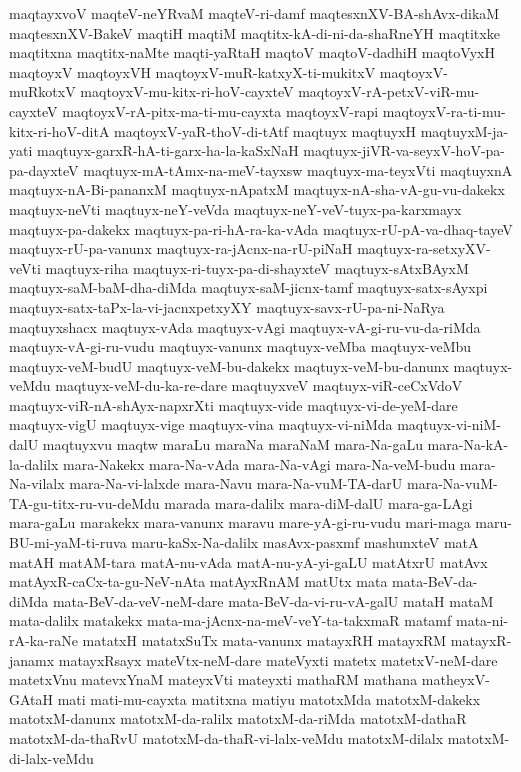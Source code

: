 {maqtayxvoV
maqteV-neYRvaM
maqteV-ri-damf
maqtesxnXV-BA-shAvx-dikaM
maqtesxnXV-BakeV
maqtiH
maqtiM
maqtitx-kA-di-ni-da-shaRneYH
maqtitxke
maqtitxna
maqtitx-naMte
maqti-yaRtaH
maqtoV
maqtoV-dadhiH
maqtoVyxH
maqtoyxV
maqtoyxVH
maqtoyxV-muR-katxyX-ti-mukitxV
maqtoyxV-muRkotxV
maqtoyxV-mu-kitx-ri-hoV-cayxteV
maqtoyxV-rA-petxV-viR-mu-cayxteV
maqtoyxV-rA-pitx-ma-ti-mu-cayxta
maqtoyxV-rapi
maqtoyxV-ra-ti-mu-kitx-ri-hoV-ditA
maqtoyxV-yaR-thoV-di-tAtf
maqtuyx
maqtuyxH
maqtuyxM-ja-yati
maqtuyx-garxR-hA-ti-garx-ha-la-kaSxNaH
maqtuyx-jiVR-va-seyxV-hoV-pa-pa-dayxteV
maqtuyx-mA-tAmx-na-meV-tayxsw
maqtuyx-ma-teyxVti
maqtuyxnA
maqtuyx-nA-Bi-pananxM
maqtuyx-nApatxM
maqtuyx-nA-sha-vA-gu-vu-dakekx
maqtuyx-neVti
maqtuyx-neY-veVda
maqtuyx-neY-veV-tuyx-pa-karxmayx
maqtuyx-pa-dakekx
maqtuyx-pa-ri-hA-ra-ka-vAda
maqtuyx-rU-pA-va-dhaq-tayeV
maqtuyx-rU-pa-vanunx
maqtuyx-ra-jAcnx-na-rU-piNaH
maqtuyx-ra-setxyXV-veVti
maqtuyx-riha
maqtuyx-ri-tuyx-pa-di-shayxteV
maqtuyx-sAtxBAyxM
maqtuyx-saM-baM-dha-diMda
maqtuyx-saM-jicnx-tamf
maqtuyx-satx-sAyxpi
maqtuyx-satx-taPx-la-vi-jacnxpetxyXY
maqtuyx-savx-rU-pa-ni-NaRya
maqtuyxshacx
maqtuyx-vAda
maqtuyx-vAgi
maqtuyx-vA-gi-ru-vu-da-riMda
maqtuyx-vA-gi-ru-vudu
maqtuyx-vanunx
maqtuyx-veMba
maqtuyx-veMbu
maqtuyx-veM-budU
maqtuyx-veM-bu-dakekx
maqtuyx-veM-bu-danunx
maqtuyx-veMdu
maqtuyx-veM-du-ka-re-dare
maqtuyxveV
maqtuyx-viR-ceCxVdoV
maqtuyx-viR-nA-shAyx-napxrXti
maqtuyx-vide
maqtuyx-vi-de-yeM-dare
maqtuyx-vigU
maqtuyx-vige
maqtuyx-vina
maqtuyx-vi-niMda
maqtuyx-vi-niM-dalU
maqtuyxvu
maqtw
maraLu
maraNa
maraNaM
mara-Na-gaLu
mara-Na-kA-la-dalilx
mara-Nakekx
mara-Na-vAda
mara-Na-vAgi
mara-Na-veM-budu
mara-Na-vilalx
mara-Na-vi-lalxde
mara-Navu
mara-Na-vuM-TA-darU
mara-Na-vuM-TA-gu-titx-ru-vu-deMdu
marada
mara-dalilx
mara-diM-dalU
mara-ga-LAgi
mara-gaLu
marakekx
mara-vanunx
maravu
mare-yA-gi-ru-vudu
mari-maga
maru-BU-mi-yaM-ti-ruva
maru-kaSx-Na-dalilx
masAvx-pasxmf
mashunxteV
matA
matAH
matAM-tara
matA-nu-vAda
matA-nu-yA-yi-gaLU
matAtxrU
matAvx
matAyxR-caCx-ta-gu-NeV-nAta
matAyxRnAM
matUtx
mata
mata-BeV-da-diMda
mata-BeV-da-veV-neM-dare
mata-BeV-da-vi-ru-vA-galU
mataH
mataM
mata-dalilx
matakekx
mata-ma-jAcnx-na-meV-veY-ta-takxmaR
matamf
mata-ni-rA-ka-raNe
matatxH
matatxSuTx
mata-vanunx
matayxRH
matayxRM
matayxR-janamx
matayxRsayx
mateVtx-neM-dare
mateVyxti
matetx
matetxV-neM-dare
matetxVnu
matevxYnaM
mateyxVti
mateyxti
mathaRM
mathana
matheyxV-GAtaH
mati
mati-mu-cayxta
matitxna
matiyu
matotxMda
matotxM-dakekx
matotxM-danunx
matotxM-da-ralilx
matotxM-da-riMda
matotxM-dathaR
matotxM-da-thaRvU
matotxM-da-thaR-vi-lalx-veMdu
matotxM-dilalx
matotxM-di-lalx-veMdu
}
